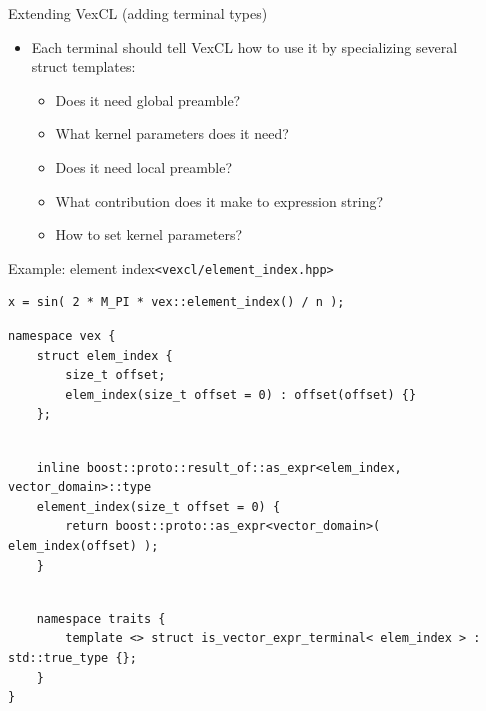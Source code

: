 \documentclass[@BEAMER_OPTIONS@]{beamer}
\newcommand{\code}[1]{\lstinline|#1|}
\begin{document}
\begin{frame}{Extending VexCL (adding terminal types)}
    \begin{itemize}
        \item Each terminal should tell VexCL how to use it by specializing
            several\\ struct templates:
            \begin{itemize}
                \item Does it need global preamble?
                \item What kernel parameters does it need?
                \item Does it need local preamble?
                \item What contribution does it make to expression string?
                \item How to set kernel parameters?
            \end{itemize}
    \end{itemize}
\end{frame}

\begin{frame}[fragile]{Example: element index}{\code{<vexcl/element_index.hpp>}}
    \begin{exampleblock}{}
        \begin{lstlisting}
x = sin( 2 * M_PI * vex::element_index() / n );
        \end{lstlisting}
    \end{exampleblock}
    \pause
    \begin{exampleblock}{}
        \begin{lstlisting}
namespace vex {
    struct elem_index {
        size_t offset;
        elem_index(size_t offset = 0) : offset(offset) {}
    };
        \end{lstlisting}
        \pause
        \begin{lstlisting}[firstnumber=last]

    inline boost::proto::result_of::as_expr<elem_index, vector_domain>::type
    element_index(size_t offset = 0) {
        return boost::proto::as_expr<vector_domain>( elem_index(offset) );
    }
        \end{lstlisting}
        \pause
        \begin{lstlisting}[firstnumber=last]

    namespace traits {
        template <> struct is_vector_expr_terminal< elem_index > : std::true_type {};
    }
}
        \end{lstlisting}
    \end{exampleblock}
\end{frame}
\end{document}
